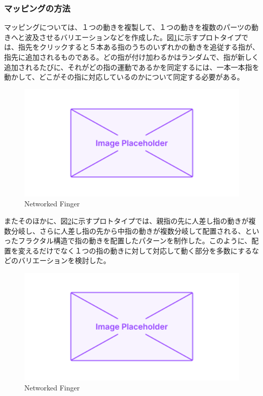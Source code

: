\subsubsection*{マッピングの方法}
マッピングについては、１つの動きを複製して、１つの動きを複数のパーツの動きへと波及させるバリエーションなどを作成した。図\ref{fig:networked_finger}に示すプロトタイプでは、指先をクリックすると５本ある指のうちのいずれかの動きを追従する指が、指先に追加されるものである。どの指が付け加わるかはランダムで、指が新しく追加されるたびに、それがどの指の運動であるかを同定するには、一本一本指を動かして、どこがその指に対応しているのかについて同定する必要がある。
\begin{figure}[H]
  \centering
  \includegraphics[width=15cm]{img/placeholder.png}
  \caption{Networked Finger}
  \label{fig:networked_finger}
\end{figure}

またそのほかに、図\ref{fig:fractal_finger}に示すプロトタイプでは、親指の先に人差し指の動きが複数分岐し、さらに人差し指の先から中指の動きが複数分岐して配置される、といったフラクタル構造で指の動きを配置したパターンを制作した。このように、配置を変えるだけでなく１つの指の動きに対して対応して動く部分を多数にするなどのバリエーションを検討した。

\begin{figure}[H]
  \centering
  \includegraphics[width=15cm]{img/placeholder.png}
  \caption{Networked Finger}
  \label{fig:fractal_finger}
\end{figure}
